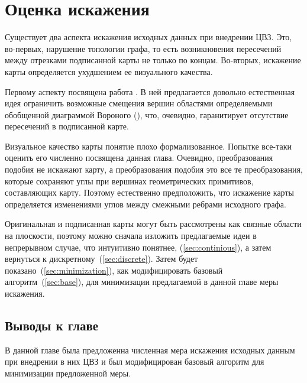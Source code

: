 \chapter{Оценка искажения}

Существует два аспекта искажения исходных данных при внедрении ЦВЗ. Это, во-первых, нарушение топологии графа,
то есть возникновения пересечений между отрезками подписанной карты не только по концам. Во-вторых, искажение
карты определяется ухудшением ее визуального качества.

Первому аспекту посвящена работа \cite{Huber}. В ней предлагается довольно естественная идея ограничить 
возможные смещения вершин областями определяемыми обобщенной диаграммой Вороного (\cite{Held}), что, очевидно,
гаранитирует отсутствие пересечений в подписанной карте.

Визуальное качество карты понятие плохо формализованное. Попытке все-таки оценить его численно посвящена данная
глава. Очевидно, преобразования подобия не искажают карту, а преобразования подобия это все те преобразования, 
которые сохраняют углы при вершинах геометрических 
примитивов, составляющих карту. Поэтому естественно предположить, что искажение карты определяется изменениями
углов между смежными ребрами исходного графа.

Оригинальная и подписанная карты могут быть рассмотрены как связные области на плоскости, поэтому можно сначала
изложить предлагаемые идеи в непрерывном случае, что интуитивно понятнее,  (\ref{sec:continious}), а затем вернуться к 
дискретному~(\ref{sec:discrete}). Затем будет показано~(\ref{sec:minimization}), как модифицировать 
базовый алгоритм~(\ref{sec:base}), для минимизации предлагаемой в данной главе меры искажения.





\section{Выводы к главе}
В данной главе была предложенна численная мера искажения исходных данным при внедрении в них ЦВЗ
и был модифицирован базовый алгоритм для минимизации предложенной меры.
